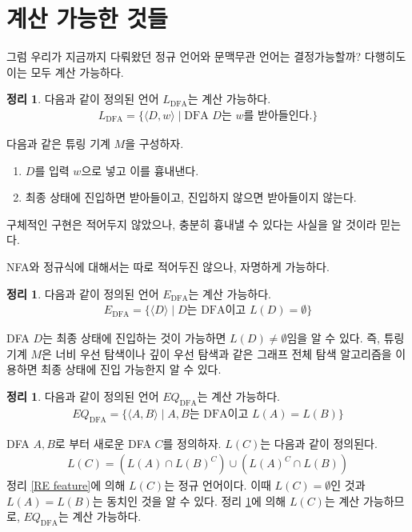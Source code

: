 \documentclass[b5paper, 10pt]{book}
\theoremstyle{definition}
\newtheorem{thm}[defn]{정리}
\newenvironment{pf*}{\pushQED{\qed}\pf}{\popQED\endpf}
\begin{document}
\section{계산 가능한 것들}
그럼 우리가 지금까지 다뤄왔던 정규 언어와 문맥무관 언어는 결정가능할까? 
다행히도 이는 모두 계산 가능하다.
\begin{thm}
    다음과 같이 정의된 언어 $L_{\text{DFA}}$는 계산 가능하다.
    \begin{align*}
        L_{\text{DFA}} = \{ \langle D, w \rangle \;\vert\; 
        \text{DFA } D \text{는 }w\text{를 받아들인다.}\}
    \end{align*}
\end{thm}
\begin{pf*}
    다음과 같은 튜링 기계 $M$을 구성하자.
    \begin{enumerate}
        \item $D$를 입력 $w$으로 넣고 이를 흉내낸다. 
        \item 최종 상태에 진입하면 받아들이고, 진입하지 않으면 받아들이지 않는다.
    \end{enumerate}
    구체적인 구현은 적어두지 않았으나, 충분히 흉내낼 수 있다는 사실을 알 것이라 믿는다.
\end{pf*}
NFA와 정규식에 대해서는 따로 적어두진 않으나, 자명하게 가능하다.
\begin{thm}
    \label{empty DFA}
    다음과 같이 정의된 언어 $E_{\text{DFA}}$는 계산 가능하다.
    \begin{align*}
        E_{\text{DFA}} = \{ \langle D \rangle \;\vert\; 
        D\text{는 DFA이고 } L(D) = \emptyset\}
    \end{align*}
\end{thm}
\begin{pf*}
    DFA $D$는 최종 상태에 진입하는 것이 가능하면 $L(D) \neq \emptyset$임을
    알 수 있다. 즉, 튜링 기계 $M$은 너비 우선 탐색이나 깊이 우선 탐색과 같은 
    그래프 전체 탐색 알고리즘을 이용하면 최종 상태에 진입 가능한지 알 수 있다. 
\end{pf*}
\begin{thm}
    \label{DFA equiv decidable}
    다음과 같이 정의된 언어 $EQ_{\text{DFA}}$는 계산 가능하다.
    \begin{align*}
        EQ_{\text{DFA}} = \{ \langle A, B \rangle \;\vert\; 
        A, B\text{는 DFA이고 } L(A) = L(B)\}
    \end{align*}
\end{thm}
\begin{pf*}
    DFA $A, B$로 부터 새로운 DFA $C$를 정의하자. $L(C)$는
    다음과 같이 정의된다.
    \begin{align*}
        L(C) = \left( L(A) \cap L(B)^C \right) \cup
        \left( L(A)^C \cap L(B)\right)
    \end{align*}
    정리 \ref{RE feature}에 의해 $L(C)$는 정규 언어이다. 이때
    $L(C) = \emptyset$인 것과 $L(A) = L(B)$는 동치인 것을 알 수 있다.
    정리 \ref{empty DFA}에 의해 $L(C)$는 계산 가능하므로, $EQ_{\text{DFA}}$는 
    계산 가능하다.
\end{pf*}
\end{document}
